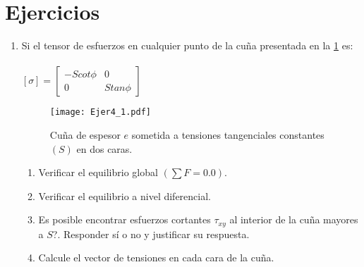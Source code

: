\documentclass[../notas medios.tex]{subfiles}
\begin{document}
\newpage
\section*{Ejercicios}


\begin{enumerate}
  
\item \label{punto01} Si el tensor de esfuerzos en cualquier punto de la cu\~na
presentada en la \cref{figure4} es:\\
	\\
	$[\sigma] = \left[ \begin{array}{ccc}
	-S cot \phi & 0 \\ 
	0 & S tan \phi
	\end{array}  \right] $\\
	\begin{figure}[H]
		\centering
		\texttt{[image: Ejer4\_1.pdf]}
		\caption{Cuña de espesor $e$ sometida a tensiones tangenciales constantes $(S)$ en dos caras.}
		\label{figure4}
	\end{figure}
	\begin{enumerate}
		\item Verificar el equilibrio global $\left( \sum F = 0.0 \right)$.
		\item Verificar el equilibrio a nivel diferencial.
		\item  \textquestiondown Es posible encontrar esfuerzos cortantes $\tau_{xy}$ al interior de la cu\~na mayores a $S$?. Responder s\'i o no y justificar su respuesta.
		\item Calcule el vector de tensiones en cada cara de la cu\~na. 
	\end{enumerate}




\end{enumerate}
\end{document}
